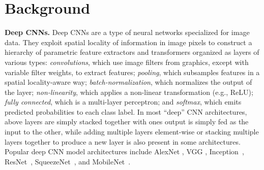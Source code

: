 \section{Background}

\vspace{2mm}
\noindent \textbf{Deep CNNs.} Deep CNNs are a type of neural networks specialized for image data.
They exploit spatial locality of information in image pixels to construct a hierarchy of parametric feature extractors and transformers organized as layers of various types: \textit{convolutions}, which use image
filters from graphics, except with variable filter weights, to extract features; \textit{pooling}, which subsamples features in a spatial
locality-aware way; \textit{batch-normalization}, which normalizes the output of the layer; \textit{non-linearity}, which applies a non-linear transformation (e.g., ReLU); \textit{fully connected}, which is a multi-layer perceptron; and \textit{softmax}, which emits predicted probabilities to each class label.
In most ``deep'' CNN architectures, above layers are simply stacked together with ones output is simply fed as the input to the other, while adding multiple layers element-wise or stacking multiple layers together to produce a new layer is also present in some architectures.
Popular deep CNN model architectures include AlexNet \cite{alexnet}, VGG \cite{vggnet}, Inception~\cite{inception}, ResNet~\cite{resnet}, SqueezeNet~\cite{squeezenet}, and MobileNet~\cite{mobilenets}.


